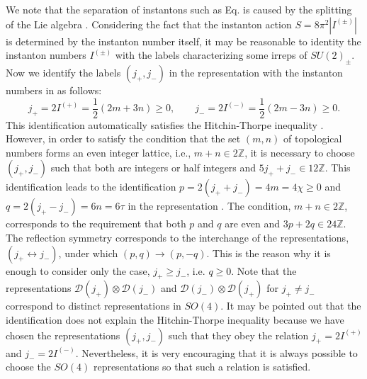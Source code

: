 \documentclass[12pt,epsf]{article}
\begin{document}
We note that the separation of instantons such as Eq. 
is caused by the splitting of the Lie algebra .
Considering the fact that the instanton action $S= 8 \pi^2 |I^{(\pm)}|$
is determined by the instanton number itself, it may be reasonable to identity
the instanton numbers $I^{(\pm)}$ with the labels characterizing some irreps of $SU(2)_\pm$.
Now we identify the labels $(j_+, j_-)$ in the representation 
with the instanton numbers in  as follows:
\begin{equation}\label{id-inst-pq}
 j_+ = 2  I^{(+)} = \frac{1}{2} (2m + 3n) \geq 0, \qquad
 j_- = 2  I^{(-)} = \frac{1}{2} (2m - 3n) \geq 0.
\end{equation}
This identification automatically satisfies the Hitchin-Thorpe inequality .
However, in order to satisfy the condition that the set $(m,n)$ of topological numbers forms an even integer lattice,
i.e., $m + n \in 2 \mathbb{Z}$, it is necessary to choose $(j_+, j_-)$ such that
both are integers or half integers and $5j_+ + j_- \in 12 \mathbb{Z}$.
This identification leads to the identification
$p = 2 (j_+ + j_-) = 4m = 4 \chi \geq 0$ and $q = 2 (j_+ - j_-) =6n = 6 \tau$ in the representation .
The condition, $m + n \in 2 \mathbb{Z}$, corresponds to the requirement that both $p$ and $q$ are even
and $3p + 2q \in 24 \mathbb{Z}$.
The reflection symmetry  corresponds to the interchange of the representations, $(j_+ \leftrightarrow j_-)$,
under which $(p, q) \to (p, - q)$. This is the reason why it is enough to consider only the case, $j_+ \geq j_-$,
i.e. $q \geq 0$. Note that the representations $\mathcal{D}(j_+) \otimes \mathcal{D}(j_-)$ and
$\mathcal{D}(j_-) \otimes \mathcal{D}(j_+)$ for $j_+ \neq j_-$ correspond to distinct representations in $SO(4)$.
It may be pointed out that the identification  does not explain the Hitchin-Thorpe inequality 
because we have chosen the representations $(j_+, j_-)$ such that they obey the relation $ j_+ = 2  I^{(+)}$ and
$j_- = 2  I^{(-)}$. Nevertheless, it is very encouraging that it is always possible to choose
the $SO(4)$ representations so that such a relation is satisfied.
\end{document}
